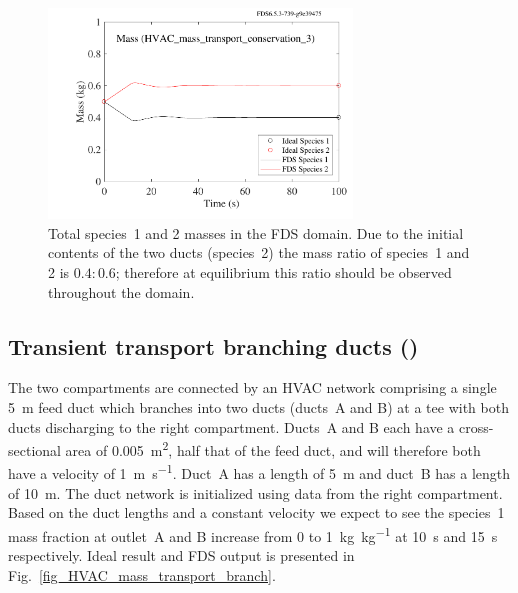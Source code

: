 \documentclass[11pt]{book}
\begin{document}
\begin{figure}[ht]
\centering
\includegraphics[height=2.2in]{SCRIPT_FIGURES/HVAC_mass_transport_conservation_3}
\caption[ test case]{Total species~1 and 2 masses in the FDS domain. Due to the initial contents of the two ducts (species~2) the mass ratio of species~1 and 2 is \(0.4 \colon 0.6\); therefore at equilibrium this ratio should be observed throughout the domain.}
\label{fig_HVAC_mass_transport_conservation_3}
\end{figure}

\subsection{Transient transport branching ducts (\texorpdfstring{}{HVAC\_mass\_transport\_branch})}
\label{HVAC_mass_transport_branch}
The two compartments are connected by an HVAC network comprising a single \SI{5}{\meter} feed duct which branches into two ducts (ducts~A and B) at a tee with both ducts discharging to the right compartment. Ducts~A and B each have a cross-sectional area of \SI{0.005}{\meter\squared}, half that of the feed duct, and will therefore both have a velocity of \SI[per-mode=symbol]{1}{\meter\per\second}. Duct~A has a length of \SI{5}{\meter} and duct~B has a length of \SI{10}{\meter}. The duct network is initialized using data from the right compartment. Based on the duct lengths and a constant velocity we expect to see the species~\num{1} mass fraction at outlet~A and B increase from \num{0} to \SI[per-mode=symbol]{1}{\kilogram\per\kilogram} at \SI{10}{\second} and \SI{15}{\second} respectively. Ideal result and FDS output is presented in Fig.~\ref{fig_HVAC_mass_transport_branch}.
\end{document}
